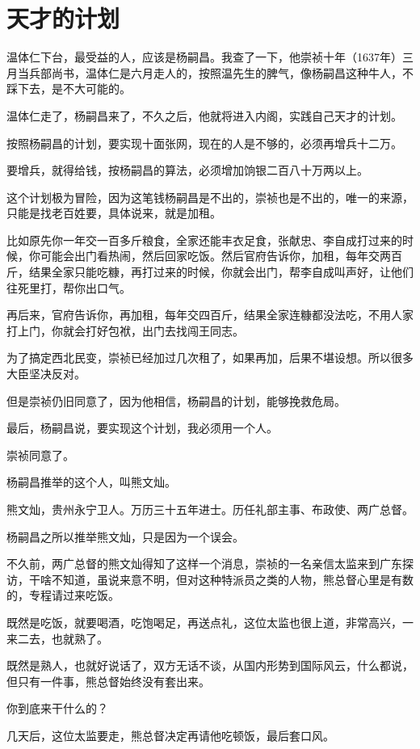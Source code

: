 \section{天才的计划}
\ifnum{}
	\begin{multicols}{\theparacolNo}
\fi
温体仁下台，最受益的人，应该是杨嗣昌。我查了一下，他崇祯十年（1637年）三月当兵部尚书，温体仁是六月走人的，按照温先生的脾气，像杨嗣昌这种牛人，不踩下去，是不大可能的。

温体仁走了，杨嗣昌来了，不久之后，他就将进入内阁，实践自己天才的计划。

按照杨嗣昌的计划，要实现十面张网，现在的人是不够的，必须再增兵十二万。

要增兵，就得给钱，按杨嗣昌的算法，必须增加饷银二百八十万两以上。

这个计划极为冒险，因为这笔钱杨嗣昌是不出的，崇祯也是不出的，唯一的来源，只能是找老百姓要，具体说来，就是加租。

比如原先你一年交一百多斤粮食，全家还能丰衣足食，张献忠、李自成打过来的时候，你可能会出门看热闹，然后回家吃饭。然后官府告诉你，加租，每年交两百斤，结果全家只能吃糠，再打过来的时候，你就会出门，帮李自成叫声好，让他们往死里打，帮你出口气。

再后来，官府告诉你，再加租，每年交四百斤，结果全家连糠都没法吃，不用人家打上门，你就会打好包袱，出门去找闯王同志。

为了搞定西北民变，崇祯已经加过几次租了，如果再加，后果不堪设想。所以很多大臣坚决反对。

但是崇祯仍旧同意了，因为他相信，杨嗣昌的计划，能够挽救危局。

最后，杨嗣昌说，要实现这个计划，我必须用一个人。

崇祯同意了。

杨嗣昌推举的这个人，叫熊文灿。

熊文灿，贵州永宁卫人。万历三十五年进士。历任礼部主事、布政使、两广总督。

杨嗣昌之所以推举熊文灿，只是因为一个误会。

不久前，两广总督的熊文灿得知了这样一个消息，崇祯的一名亲信太监来到广东探访，干啥不知道，虽说来意不明，但对这种特派员之类的人物，熊总督心里是有数的，专程请过来吃饭。

既然是吃饭，就要喝酒，吃饱喝足，再送点礼，这位太监也很上道，非常高兴，一来二去，也就熟了。

既然是熟人，也就好说话了，双方无话不谈，从国内形势到国际风云，什么都说，但只有一件事，熊总督始终没有套出来。

你到底来干什么的？

几天后，这位太监要走，熊总督决定再请他吃顿饭，最后套口风。


\end{multicols}
